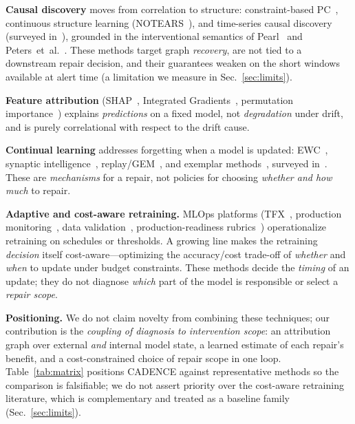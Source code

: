 \documentclass[conference]{IEEEtran}
\begin{document}
\textbf{Causal discovery} moves from correlation to structure:
constraint-based PC~\cite{spirtes2000causation}, continuous structure
learning (NOTEARS~\cite{zheng2018notears}), and time-series causal
discovery~\cite{runge2019pcmci} (surveyed in~\cite{glymour2019review}),
grounded in the interventional semantics of
Pearl~\cite{pearl2009causality} and Peters~et~al.~\cite{peters2017elements}.
These methods target graph \emph{recovery}, are not tied to a downstream
repair decision, and their guarantees weaken on the short windows
available at alert time (a limitation we measure in Sec.~\ref{sec:limits}).

\textbf{Feature attribution} (SHAP~\cite{lundberg2017shap}, Integrated
Gradients~\cite{sundararajan2017ig}, permutation
importance~\cite{breiman2001random}) explains \emph{predictions} on a fixed
model, not \emph{degradation} under drift, and is purely correlational
with respect to the drift cause.

\textbf{Continual learning} addresses forgetting when a model is updated:
EWC~\cite{kirkpatrick2017ewc}, synaptic intelligence~\cite{zenke2017si},
replay/GEM~\cite{lopezpaz2017gem}, and exemplar
methods~\cite{rebuffi2017icarl}, surveyed in~\cite{delange2021continual}.
These are \emph{mechanisms} for a repair, not policies for choosing
\emph{whether and how much} to repair.

\textbf{Adaptive and cost-aware retraining.} MLOps platforms
(TFX~\cite{baylor2017tfx}, production monitoring~\cite{klaise2020monitoring},
data validation~\cite{polyzotis2019data}, production-readiness
rubrics~\cite{breck2017mltest}) operationalize retraining on schedules or
thresholds. A growing line makes the retraining \emph{decision} itself
cost-aware---optimizing the accuracy/cost trade-off of \emph{whether} and
\emph{when} to update under budget constraints. These methods decide the
\emph{timing} of an update; they do not diagnose \emph{which} part of the
model is responsible or select a \emph{repair scope}.

\textbf{Positioning.} We do not claim novelty from combining these
techniques; our contribution is the \emph{coupling of diagnosis to
intervention scope}: an attribution graph over external \emph{and}
internal model state, a learned estimate of each repair's benefit, and a
cost-constrained choice of repair scope in one loop. Table~\ref{tab:matrix}
positions CADENCE against representative methods so the comparison is
falsifiable; we do not assert priority over the cost-aware retraining
literature, which is complementary and treated as a baseline family
(Sec.~\ref{sec:limits}).
\end{document}
